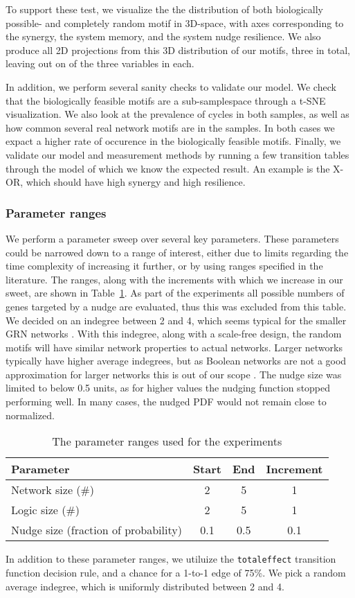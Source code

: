 \documentclass[../main.tex]{subfiles}
\begin{document}
To support these test, we visualize the the distribution of both biologically possible- and completely random motif in 3D-space, with axes corresponding to the synergy, the system memory, and the system nudge resilience.
We also produce all 2D projections from this 3D distribution of our motifs, three in total, leaving out on of the three variables in each.

In addition, we perform several sanity checks to validate our model.
We check that the biologically feasible motifs are a sub-samplespace through a t-SNE visualization.
We also look at the prevalence of cycles in both samples, as well as how common several real network motifs are in the samples.
In both cases we expact a higher rate of occurence in the biologically feasible motifs.
Finally, we validate our model and measurement methods by running a few transition tables through the model of which we know the expected result.
An example is the X-OR, which should have high synergy and high resilience.

\subsubsection{Parameter ranges}

We perform a parameter sweep over several key parameters.
These parameters could be narrowed down to a range of interest, either due to limits regarding the time complexity of increasing it further, or by using ranges specified in the literature.
The ranges, along with the increments with which we increase in our sweet, are shown in Table~\ref{parameters}.
As part of the experiments all possible numbers of genes targeted by a nudge are evaluated, thus this was excluded from this table.
We decided on an indegree between 2 and 4, which seems typical for the smaller GRN networks \cite{lahdesmaki2003learning}.
With this indegree, along with a scale-free design, the random motifs will have similar network properties to actual networks.
Larger networks typically have higher average indegrees, but as Boolean networks are not a good approximation for larger networks this is out of our scope \cite{lahdesmaki2003learning, karlebach2008modelling}.
The nudge size was limited to below 0.5 units, as for higher values the nudging function stopped performing well.
In many cases, the nudged PDF would not remain close to normalized.

\begin{table}
\begin{center}
\label{parameters}
\caption{The parameter ranges used for the experiments}
\begin{tabular}{| l | c | c | c |}
\hline
Parameter & Start & End & Increment \\
\hline
Network size (\#) & 2 & 5 & 1 \\
Logic size (\#) & 2 & 5 & 1 \\
Nudge size (fraction of probability) & 0.1 & 0.5 & 0.1 \\
\hline
\end{tabular}
\end{center}
\end{table}

In addition to these parameter ranges, we utiluize the \texttt{totaleffect} transition function decision rule, and a chance for a 1-to-1 edge of 75\%.
We pick a random average indegree, which is uniformly distributed between 2 and 4.
\end{document}

